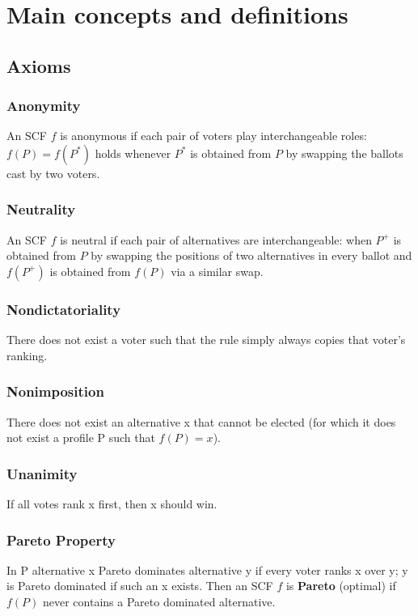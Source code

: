 
\section{Main concepts and definitions}



\subsection{Axioms}

	\subsubsection{Anonymity}
	An SCF $f$ is anonymous if each pair of voters play interchangeable roles: $f(P)=f(P^{\ast})$ holds whenever $P^{\ast}$
	is obtained from $P$ by swapping the ballots cast by two voters.
	
	\subsubsection{Neutrality}
	An SCF $f$ is neutral if each pair of alternatives are
	interchangeable: when $P^+$ is obtained from $P$ by swapping the positions of two alternatives in every ballot and $f(P^+)$ is obtained from $f(P)$ via a similar swap.
	
	\subsubsection{Nondictatoriality}
	There does not exist a voter such that the rule simply always copies that voter’s ranking.
	
	\subsubsection{Nonimposition}
	There does not exist an alternative x that cannot be elected (for which it does not exist a profile P such that $f(P)={x}$).
	
	\subsubsection{Unanimity}
	If all votes rank x first, then x should win.
	
	\subsubsection{Pareto Property}
	In P alternative x Pareto dominates alternative y if every voter ranks x over y; y is Pareto dominated if such an x exists. Then an SCF $f$ is \textbf{Pareto} (optimal) if $f(P)$ never contains a Pareto dominated alternative.
	
